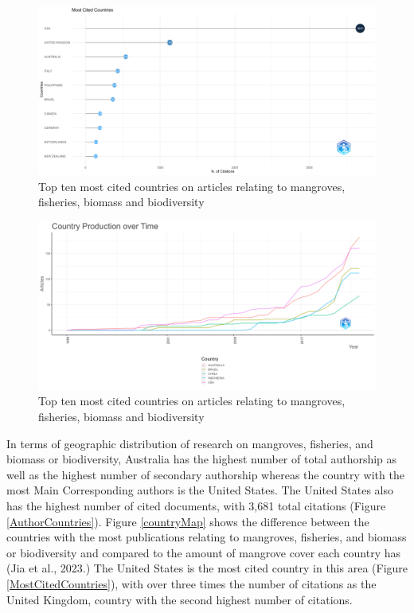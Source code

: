\documentclass[
  12pt,
]{article}
\begin{document}
\begin{figure}
\includegraphics[width=1\linewidth]{MostCitedCountries} \caption{Top ten most cited countries on articles relating to mangroves, fisheries, biomass and biodiversity \label{MostCitedCountries}}\label{fig:MostCitedCountries}
\end{figure}

\begin{figure}
\includegraphics[width=1\linewidth]{CountryOverTime} \caption{Top ten most cited countries on articles relating to mangroves, fisheries, biomass and biodiversity \label{MostCitedCountries}}\label{fig:CountryOverTime}
\end{figure}



In terms of geographic distribution of research on mangroves, fisheries, and biomass or biodiversity, Australia has the highest number of total authorship as well as the highest number of secondary authorship whereas the country with the most Main Corresponding authors is the United States. The United States also has the highest number of cited documents, with 3,681 total citations (Figure \ref{AuthorCountries}). Figure \ref{countryMap} shows the difference between the countries with the most publications relating to mangroves, fisheries, and biomass or biodiversity and compared to the amount of mangrove cover each country has (Jia et al., 2023.) The United States is the most cited country in this area (Figure \ref{MostCitedCountries}), with over three times the number of citations as the United Kingdom, country with the second highest number of citations.
\end{document}

